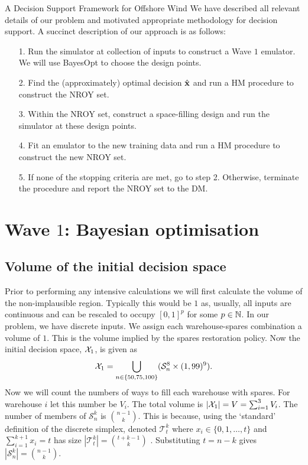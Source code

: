 \begin{chapter}{A Decision Support Framework for Offshore Wind \label{Ch:ds-for-ow}}
We have described all relevant details of our problem and motivated appropriate methodology for decision support. A succinct description of our approach is as follows:
\begin{itemize}
 \item[1.] Run the simulator at collection of inputs to construct a Wave $1$ emulator. We will use BayesOpt to choose the design points.
 \item[2.] Find the (approximately) optimal decision $\hat{\mathbf{x}}$ and run a HM procedure to construct the NROY set.
 \item[3.] Within the NROY set, construct a space-filling design and run the simulator at these design points.
 \item[4.] Fit an emulator to the new training data and run a HM procedure to construct the new NROY set.
 \item[5.] If none of the stopping criteria are met, go to step 2. Otherwise, terminate the procedure and report the NROY set to the DM.
\end{itemize}

\section{Wave $1$: Bayesian optimisation}
\subsection{Volume of the initial decision space}
Prior to performing any intensive calculations we will first calculate the volume of the non-implausible region. Typically this would be $1$ as, usually, all inputs are continuous and can be rescaled to occupy $[0,1]^p$ for some $p \in \mathbb{N}$. In our problem, we have discrete inputs. We assign each warehouse-spares combination a volume of $1$. This is the volume implied by the spares restoration policy. Now the initial decision space, $\mathcal{X}_1$, is given as
\begin{equation}
 \mathcal{X}_1 = \bigcup_{n \in \{50, 75, 100\}} (\mathcal{S}^8_{n} \times (1, 99)^9).
\end{equation}
Now we will count the numbers of ways to fill each warehouse with spares. For warehouse $i$ let this number be $V_i$. The total volume is $|\mathcal{X}_1| = V = \sum_{i=1}^3 V_i$. The number of members of $\mathcal{S}^k_n$ is ${n-1 \choose k}$. This is because, using the `standard' definition of the discrete simplex, denoted $\mathcal{T}^k_t$ where $x_i \in \{0, 1, \ldots, t\}$ and $\sum_{i=1}^{k+1} x_i = t$ has size $|\mathcal{T}^k_t| = {t+k-1 \choose k}$ \citep{Costello1971}. Substituting $t = n-k$ gives $|\mathcal{S}^k_n| = {n-1 \choose k}$.


\end{chapter}
